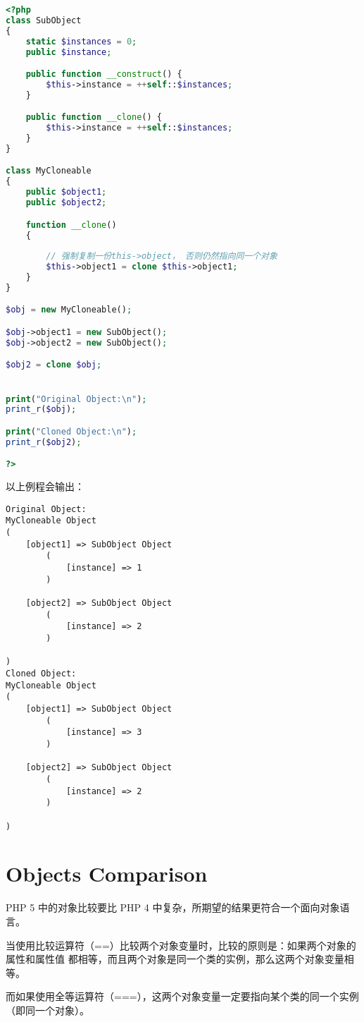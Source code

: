\begin{lstlisting}[language=PHP]
<?php
class SubObject
{
    static $instances = 0;
    public $instance;

    public function __construct() {
        $this->instance = ++self::$instances;
    }

    public function __clone() {
        $this->instance = ++self::$instances;
    }
}

class MyCloneable
{
    public $object1;
    public $object2;

    function __clone()
    {
      
        // 强制复制一份this->object， 否则仍然指向同一个对象
        $this->object1 = clone $this->object1;
    }
}

$obj = new MyCloneable();

$obj->object1 = new SubObject();
$obj->object2 = new SubObject();

$obj2 = clone $obj;


print("Original Object:\n");
print_r($obj);

print("Cloned Object:\n");
print_r($obj2);

?>
\end{lstlisting}

以上例程会输出：

\begin{verbatim}
Original Object:
MyCloneable Object
(
    [object1] => SubObject Object
        (
            [instance] => 1
        )

    [object2] => SubObject Object
        (
            [instance] => 2
        )

)
Cloned Object:
MyCloneable Object
(
    [object1] => SubObject Object
        (
            [instance] => 3
        )

    [object2] => SubObject Object
        (
            [instance] => 2
        )

)
\end{verbatim}


\chapter{Objects Comparison}

PHP 5 中的对象比较要比 PHP 4 中复杂，所期望的结果更符合一个面向对象语言。

当使用比较运算符（==）比较两个对象变量时，比较的原则是：如果两个对象的属性和属性值 都相等，而且两个对象是同一个类的实例，那么这两个对象变量相等。

而如果使用全等运算符（===），这两个对象变量一定要指向某个类的同一个实例（即同一个对象）。

